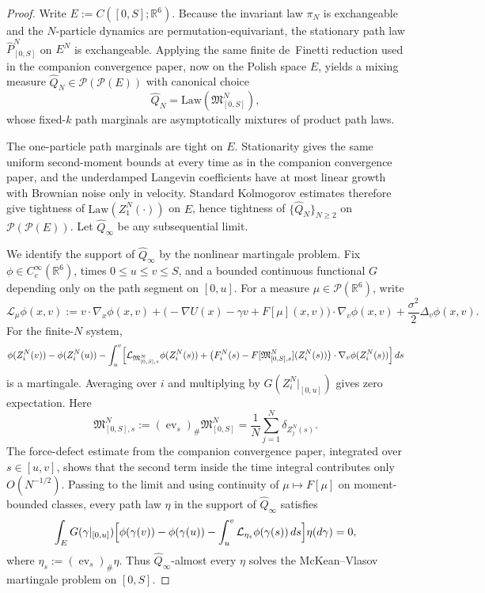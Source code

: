 \documentclass[11pt]{article}
\theoremstyle{remark}
\newcommand{\R}{\mathbb R}
\begin{document}
\begin{proof}
Write $E:=C([0,S];\R^6)$.
Because the invariant law $\pi_N$ is exchangeable and the $N$-particle
dynamics are permutation-equivariant, the stationary path law
$\widehat P_{[0,S]}^N$ on $E^N$ is exchangeable.
Applying the same finite de~Finetti reduction used in the companion
convergence paper, now on the Polish space $E$, yields a mixing measure
$\widehat Q_N\in\mathcal P(\mathcal P(E))$ with canonical choice
\[
\widehat Q_N=\mathrm{Law}(\mathfrak M_{[0,S]}^N),
\]
whose fixed-$k$ path marginals are asymptotically mixtures of product path laws.

The one-particle path marginals are tight on $E$.
Stationarity gives the same uniform second-moment bounds at every time as in
the companion convergence paper, and the underdamped Langevin coefficients have
at most linear growth with Brownian noise only in velocity.
Standard Kolmogorov estimates therefore give tightness of
$\mathrm{Law}(Z_1^N(\cdot))$ on $E$, hence tightness of $\{\widehat Q_N\}_{N\ge2}$ on
$\mathcal P(\mathcal P(E))$.
Let $\widehat Q_\infty$ be any subsequential limit.

We identify the support of $\widehat Q_\infty$ by the nonlinear martingale
problem.
Fix $\phi\in C_c^\infty(\R^6)$, times $0\le u\le v\le S$, and a bounded
continuous functional $G$ depending only on the path segment on $[0,u]$.
For a measure $\mu\in\mathcal P(\R^6)$, write
\[
\mathcal L_\mu \phi(x,v)
:=
v\cdot\nabla_x\phi(x,v)
+\bigl(-\nabla U(x)-\gamma v+F[\mu](x,v)\bigr)\cdot\nabla_v\phi(x,v)
+\frac{\sigma^2}{2}\Delta_v\phi(x,v).
\]
For the finite-$N$ system,
\[
\phi(Z_i^N(v))-\phi(Z_i^N(u))
-\int_u^v
\Bigl[
\mathcal L_{\mathfrak M_{[0,S],s}^N}\phi(Z_i^N(s))
+\bigl(F_i^N(s)-F[\mathfrak M_{[0,S],s}^N](Z_i^N(s))\bigr)
\cdot\nabla_v\phi(Z_i^N(s))
\Bigr]\,ds
\]
is a martingale.
Averaging over $i$ and multiplying by $G(Z_i^N|_{[0,u]})$ gives zero
expectation.
Here
\[
\mathfrak M_{[0,S],s}^N:=(\operatorname{ev}_s)_\#\mathfrak M_{[0,S]}^N
=
\frac1N\sum_{j=1}^N \delta_{Z_j^N(s)}.
\]
The force-defect estimate from the companion convergence paper, integrated over
$s\in[u,v]$, shows that the second term inside the time integral contributes
only $O(N^{-1/2})$.
Passing to the limit and using continuity of $\mu\mapsto F[\mu]$ on
moment-bounded classes, every path law $\eta$ in the support of
$\widehat Q_\infty$ satisfies
\[
\int_E
G(\gamma|_{[0,u]})
\Bigl[
\phi(\gamma(v))-\phi(\gamma(u))
-\int_u^v \mathcal L_{\eta_s}\phi(\gamma(s))\,ds
\Bigr]
\eta(d\gamma)
=
0,
\]
where $\eta_s:=(\operatorname{ev}_s)_\#\eta$.
Thus $\widehat Q_\infty$-almost every $\eta$ solves the McKean--Vlasov
martingale problem on $[0,S]$.


\end{proof}
\end{document}
